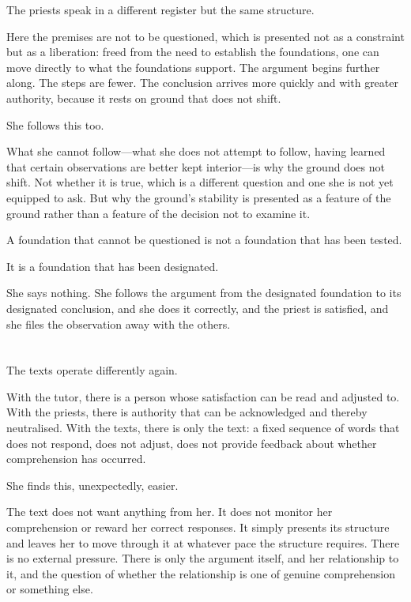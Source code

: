 The priests speak in a different register but the same
structure.

Here the premises are not to be questioned, which is
presented not as a constraint but as a liberation: freed
from the need to establish the foundations, one can move
directly to what the foundations support. The argument
begins further along. The steps are fewer. The conclusion
arrives more quickly and with greater authority, because
it rests on ground that does not shift.

She follows this too.

What she cannot follow---what she does not attempt to
follow, having learned that certain observations are better
kept interior---is why the ground does not shift. Not
whether it is true, which is a different question and one
she is not yet equipped to ask. But why the ground's
stability is presented as a feature of the ground rather
than a feature of the decision not to examine it.

A foundation that cannot be questioned is not a foundation
that has been tested.

It is a foundation that has been designated.

She says nothing. She follows the argument from the
designated foundation to its designated conclusion, and
she does it correctly, and the priest is satisfied, and
she files the observation away with the others.

\section{}

The texts operate differently again.

With the tutor, there is a person whose satisfaction can
be read and adjusted to. With the priests, there is
authority that can be acknowledged and thereby neutralised.
With the texts, there is only the text: a fixed sequence
of words that does not respond, does not adjust, does not
provide feedback about whether comprehension has occurred.

She finds this, unexpectedly, easier.

The text does not want anything from her. It does not
monitor her comprehension or reward her correct responses.
It simply presents its structure and leaves her to move
through it at whatever pace the structure requires. There
is no external pressure. There is only the argument itself,
and her relationship to it, and the question of whether
the relationship is one of genuine comprehension or
something else.

